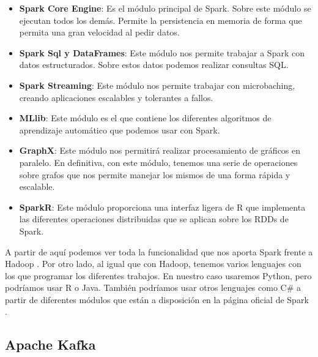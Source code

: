 \begin{itemize}
        \item \textbf{Spark Core Engine}: Es el módulo principal de Spark. Sobre este módulo se ejecutan todos los demás. Permite la persistencia en memoria de forma que permita una gran velocidad al pedir datos.\par
        \item \textbf{Spark Sql y DataFrames}: Este módulo nos permite trabajar a Spark con datos estructurados. Sobre estos datos podemos realizar consultas SQL.\par
        \item \textbf{Spark Streaming}: Este módulo nos permite trabajar con microbaching, creando aplicaciones escalables y tolerantes a fallos.
        \item \textbf{MLlib}: Este módulo es el que contiene los diferentes algoritmos de aprendizaje automático que podemos usar con Spark.
        \item \textbf{GraphX}: Este módulo nos permitirá realizar procesamiento de gráficos en paralelo. En definitiva, con este módulo, tenemos una serie de operaciones sobre grafos que nos permite manejar los mismos de una forma rápida y escalable.
        \item \textbf{SparkR}: Este módulo proporciona una interfaz ligera de R que implementa las diferentes operaciones distribuidas que se aplican sobre los RDDs de Spark.
\end{itemize}

A partir de aquí podemos ver toda la funcionalidad que nos aporta Spark frente a Hadoop \cite{Spk-7}. Por otro lado, al igual que con Hadoop, tenemos varios lenguajes con los que programar los diferentes trabajos. En nuestro caso usaremos Python, pero podríamos usar R o Java. También podríamos usar otros lenguajes como C\# a partir de diferentes módulos que están a disposición en la página oficial de Spark \cite{Spk-6}.\par


\subsection{Apache Kafka\label{Kafka}}

